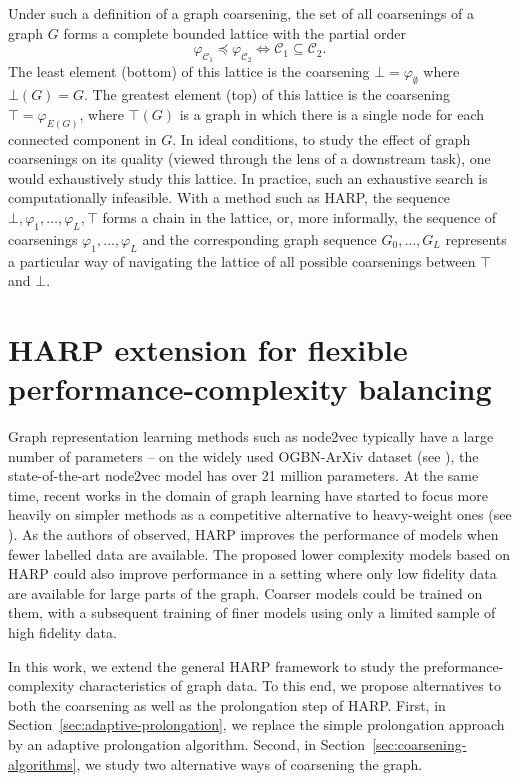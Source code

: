 \documentclass[sn-mathphys,pdflatex,iicol]{sn-jnl}%
\begin{document}
Under such a definition of a graph coarsening, the set of all coarsenings of a graph \( G \) forms a complete bounded lattice with the partial order
\[ \varphi_{\mathcal{C}_1} \preceq \varphi_{\mathcal{C}_2} \iff \mathcal{C}_1 \subseteq \mathcal{C}_2. \]
The least element (bottom) of this lattice is the coarsening \( \bot = \varphi_\emptyset \) where \( \bot \left( G \right) = G \). The greatest element (top) of this lattice is the coarsening \( \top = \varphi_{E \left( G \right)} \), where \( \top \left( G \right) \) is a graph in which there is a single node for each connected component in \( G \). In ideal conditions, to study the effect of graph coarsenings on its quality (viewed through the lens of a downstream task), one would exhaustively study this lattice. In practice, such an exhaustive search is computationally infeasible. With a method such as HARP, the sequence \( \bot, \varphi_1, \dots, \varphi_L, \top \) forms a chain in the lattice, or, more informally, the sequence of coarsenings \( \varphi_1, \dots, \varphi_L \) and the corresponding graph sequence \( G_0, \dots, G_L \) represents a particular way of navigating the lattice of all possible coarsenings between \( \top \) and \( \bot \).

\section{HARP extension for flexible performance-complexity balancing}\label{sec:our-method}

Graph representation learning methods such as node2vec typically have a large number of parameters -- on the widely used OGBN-ArXiv dataset (see \cite{hu_open_2021}), the state-of-the-art node2vec model has over 21 million parameters. At the same time, recent works in the domain of graph learning have started to focus more heavily on simpler methods as a competitive alternative to heavy-weight ones (see \cite{frasca_sign_2020, huang_combining_2020}). As the authors of \cite{chen_harp_2018} observed, HARP improves the performance of models when fewer labelled data are available. The proposed lower complexity models based on HARP could also improve performance in a setting where only low fidelity data are available for large parts of the graph. Coarser models could be trained on them, with a subsequent training of finer models using only a limited sample of high fidelity data.

In this work, we extend the general HARP framework to study the preformance-complexity characteristics of graph data. To this end, we propose alternatives to both the coarsening as well as the prolongation step of HARP. First, in Section~\ref{sec:adaptive-prolongation}, we replace the simple prolongation approach by an adaptive prolongation algorithm. Second, in Section~\ref{sec:coarsening-algorithms}, we study two alternative ways of coarsening the graph.
\end{document}
